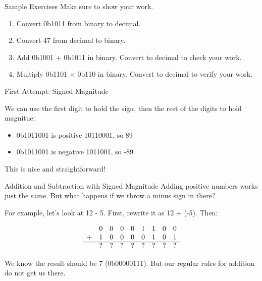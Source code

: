 \begin{frame}{Sample Exercises}
    Make sure to show your work.
    \vfill
    \begin{enumerate}
        \item Convert 0b1011 from binary to decimal. \vfill
        \item Convert 47 from decimal to binary. \vfill
        \item Add 0b1001 + 0b1011 in binary. Convert to decimal to check your work. \vfill
        \item Multiply 0b1101 $\times$ 0b110 in binary. Convert to decimal to verify your
              work. \vfill
    \end{enumerate}
\end{frame}


\begin{frame}{First Attempt: Signed Magnitude}

    We can use the first digit to hold the sign, then the rest of the digits to
    hold magnitue:

    \begin{itemize}
        \item 0b1011001 is positive 10110001, so 89
        \item 0b1011001 is negative 1011001, so -89
    \end{itemize}

    This is nice and straightforward!

\end{frame}

\begin{frame}{Addition and Subtraction with Signed Magnitude}
    Adding positive numbers works just the same. But what happens if we throw a minus sign in there?

    For example, let's look at 12 - 5. First, rewrite it as 12 + (-5). Then:

    \[
        \begin{array}{ccccccccc}
              & 0 & 0 & 0 & 0 & 1 & 1 & 0 & 0 \\
            + & 1 & 0 & 0 & 0 & 0 & 1 & 0 & 1 \\
            \hline
              & ? & ? & ? & ? & ? & ? & ? & ? \\
        \end{array}
    \]

    We know the result should be 7 (0b00000111). But our regular rules for addition
    do not get us there.
\end{frame}

